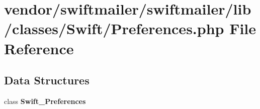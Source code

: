 \section{vendor/swiftmailer/swiftmailer/lib/classes/\+Swift/\+Preferences.php File Reference}
\label{classes_2_swift_2_preferences_8php}
\subsection*{Data Structures}
\begin{DoxyCompactItemize}
\item 
class {\bf Swift\+\_\+\+Preferences}
\end{DoxyCompactItemize}
